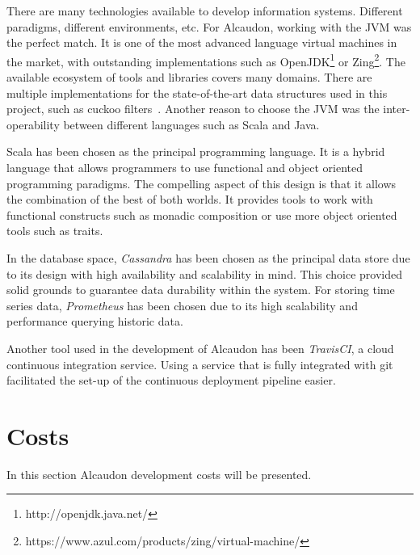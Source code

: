 There are many technologies available to develop information systems. Different
paradigms, different environments, etc. For Alcaudon, working with the \acs{JVM}
was the perfect match. It is one of the most advanced language virtual machines
in the market, with outstanding implementations such as
OpenJDK\footnote{http://openjdk.java.net/} or
Zing\footnote{https://www.azul.com/products/zing/virtual-machine/}. The
available ecosystem of tools and libraries covers many domains. There are
multiple implementations for the state-of-the-art data structures used in this
project, such as cuckoo filters~\cite{cuckoo}. Another reason to choose the \acs{JVM}
was the inter-operability between different languages such as Scala and Java.
%

Scala has been chosen as the principal programming language. It is a hybrid
language that allows programmers to use functional and object oriented
programming paradigms. The compelling aspect of this design is that it allows
the combination of the best of both worlds. It provides tools to work with
functional constructs such as monadic composition or use more object oriented
tools such as traits.

In the database space, \textit{Cassandra} has been chosen as the principal data store due
to its design with high availability and scalability in mind. This choice
provided solid grounds to guarantee data durability within the system. For storing
time series data, \textit{Prometheus} has been chosen due to its high scalability and
performance querying historic data.

Another tool used in the development of Alcaudon has been \textit{TravisCI}, a
cloud continuous integration service. Using a service that is fully integrated
with git facilitated the set-up of the continuous deployment pipeline easier.

\section{Costs}

In this section Alcaudon development costs will be presented.

